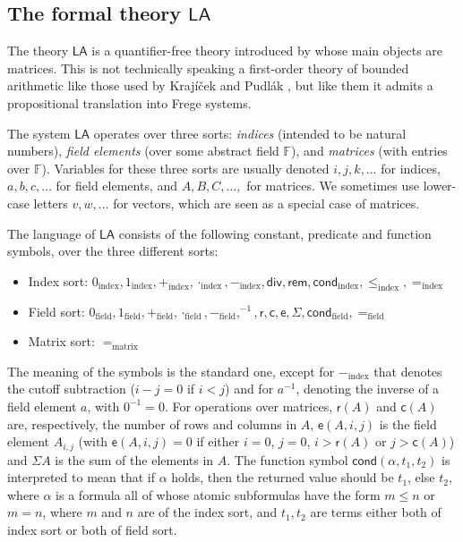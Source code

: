 \documentclass[11pt]{article}
\newcommand{\LA}{\mathsf{LA}}
\theoremstyle{definition}
\theoremstyle{plain}
\theoremstyle{remark}
\newcommand{\bF}{\mathbb{F}}
\begin{document}
\subsection{The formal theory $\LA$}
\label{subsec:LA-prelim}
The theory $\LA$ is a quantifier-free theory introduced by \citeauthor{cooksoltys} \cite{cooksoltys} whose main objects are matrices. This is not technically speaking a first-order theory of bounded arithmetic like those used by Krajíček and Pudlák \cite{KP98}, but like them it admits a propositional translation into Frege systems.

The system $\LA$ operates over three sorts: \emph{indices} (intended to be natural numbers), \emph{field elements} (over some abstract field $\bF$), and \emph{matrices} (with entries over $\bF$). Variables for these three sorts are usually denoted $i,j,k, \dots$ for indices, $a,b,c, \dots$ for field elements, and $A,B,C,\dots,$ for matrices. We sometimes use lower-case letters $v, w, \dots$ for vectors, which are seen as a special case of matrices. 

The language of $\LA$ consists of the following constant, predicate and function symbols, over the three different sorts:

\begin{itemize}
\item {Index sort}: \indent $0_{\text{index}}, 1_{\text{index}}, +_{\text{index}}, \cdot_{\text{index}}, -_{\text{index}}, \mathsf{div}, \mathsf{rem}, \mathsf{cond}_{\text{index}}, \leq_{\text{index}}, =_{\text{index}}$
    \item{Field sort}: $0_{\text{field}}, 1_{\text{field}}, +_{\text{field}}, \cdot_{\text{field}}, -_{\text{field}}, ^{-1}, \mathsf{r}, \mathsf{c}, \mathsf{e}, \Sigma, \mathsf{cond}_{\text{field}},  =_{\text{field}}$
    \item{Matrix sort}: $=_{\text{matrix}}$
\end{itemize}

The meaning of the symbols is the standard one, except for $-_{\text{index}}$ that denotes the cutoff subtraction ($i-j=0$ if $i< j$) and for $a^{-1}$, denoting the inverse of a field element $a$, with $0^{-1}=0$. For operations over matrices, $\mathsf{r}(A)$ and $\mathsf{c}(A)$ are, respectively, the number of rows and columns in $A$, $\mathsf{e}(A,i,j)$ is the field element $A_{i,j}$ (with $\mathsf{e}(A,i,j) = 0$ if either $i=0$, $j=0$, $i>\mathsf{r}(A)$ or $j>\mathsf{c}(A)$) and $\Sigma A$ is the sum of the elements in $A$. The function symbol $\mathsf{cond}(\alpha, t_1, t_2)$ is interpreted to mean that if $\alpha$ holds, then the returned value should be $t_1$, else $t_2$, where $\alpha$ is a formula all of whose atomic subformulas have the form $m\leq n$ or $m=n$, where $m$ and $n$ are of the index sort, and $t_1, t_2$ are terms either both of index sort or both of field sort.
\end{document}
